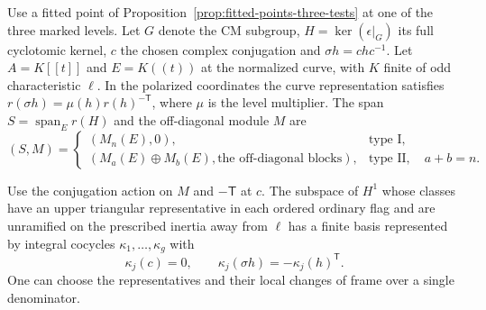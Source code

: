 \begin{established}\label{hyp:marked-square-zero-data}
Use a fitted point of Proposition~\ref{prop:fitted-points-three-tests}
at one of the three marked levels. Let \(G\) denote the CM subgroup,
\(H=\ker(\epsilon|_G)\) its full cyclotomic kernel, \(c\) the chosen
complex conjugation and \(\sigma h=chc^{-1}\). Let \(A=K[[t]]\)
and \(E=K((t))\) at the normalized curve, with \(K\) finite of
odd characteristic \(\ell\). In the polarized coordinates the
curve representation satisfies \(r(\sigma h)=\mu(h)r(h)^{-\mathsf T}\),
where \(\mu\) is the level multiplier. The span \(S=\operatorname{span}_E r(H)\) and the off-diagonal module
\(M\) are
\[
 (S,M)=\begin{cases}
 (M_n(E),0),&\text{type I},\\
 (M_a(E)\oplus M_b(E),\text{the off-diagonal blocks}),
      &\text{type II},\quad a+b=n .
 \end{cases}
\]

Use the conjugation action on \(M\) and \(-\mathsf T\) at \(c\).
The subspace of \(H^1\) whose classes have an upper triangular
representative in each ordered ordinary flag and are unramified on
the prescribed inertia away from \(\ell\) has a finite basis
represented by integral cocycles \(\kappa_1,\ldots,\kappa_g\) with
\[
 \kappa_j(c)=0,\qquad
 \kappa_j(\sigma h)=-\kappa_j(h)^{\mathsf T}.
\]
One can choose the representatives and their local changes of
frame over a single denominator.
\end{established}
